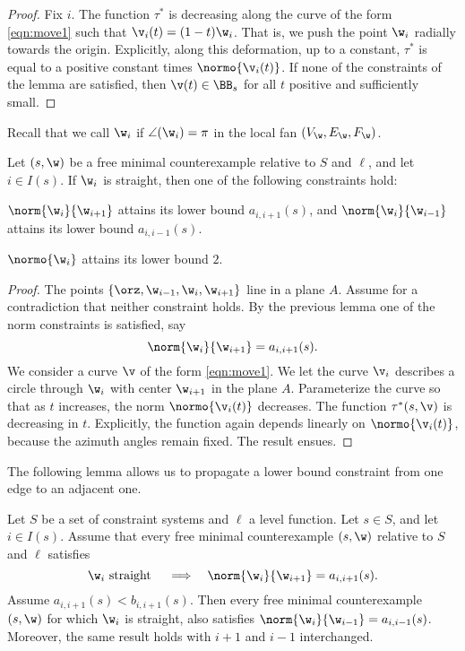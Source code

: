 \begin{proof} Fix $i$.  The function $\tau^*$ is decreasing along
the curve of the form \eqref{eqn:move1} such that
$\v_i(t)=(1-t) \w_i$.
That is, we push the point $\w_i$ radially towards the origin.
Explicitly, along this deformation, up to a constant, $\tau^*$ is equal
to a positive constant times $\normo{\v_i(t)}$.
If none of the constraints of the lemma are satisfied, then
$\v(t)\in \BB_s$ for all $t$ positive and sufficiently
small.
\end{proof}

Recall that we call $\w_i$ 
if $\angle(\w_i)=\pi$ in the local fan $(V_\w,E_\w,F_\w)$.

\begin{lemma} 
  Let $(s,\w)$ be a free minimal counterexample relative to $S$ and
  $\ell$,  and let $i\in I(s)$.  If $\w_i$ is straight, then one of the
  following constraints hold:
\item $\norm{\w_i}{\w_{i+1}}$ attains its lower bound $a_{i,i+1}(s)$, and
 $\norm{\w_i}{\w_{i-1}}$ attains its lower bound $a_{i,i-1}(s)$.
\item $\normo{\w_i}$ attains its lower bound $2$.
\end{lemma}

\begin{proof}  The points $\{\orz,\w_{i-1},\w_i,\w_{i+1}\}$ line in a plane $A$.
Assume for a contradiction that neither constraint holds.  By the previous
lemma one of the norm constraints is satisfied, say
\[
\norm{\w_i}{\w_{i+1}}=a_{i,i+1}(s).
\]
We consider a  curve $\v$ of the form \eqref{eqn:move1}.
We let the curve $\v_i$ describes a circle through
 $\w_i$ with center $\w_{i+1}$ in the plane $A$.  Parameterize the curve
so that as $t$ increases, the norm $\normo{\v_i(t)}$ decreases.
The function $\tau^*(s,\v)$ is decreasing in $t$.  Explicitly, the
function again depends linearly on $\normo{\v_i(t)}$, because
the azimuth angles remain fixed.  The result ensues.
\end{proof}

The following lemma allows us to propagate a lower bound constraint
from one edge to an adjacent one.

\begin{lemma} 
  Let $S$ be a set of constraint systems and $\ell$ a level
  function. Let $s\in S$, and let $i\in I(s)$.  Assume that every
  free minimal counterexample $(s,\w)$ relative to $S$ and $\ell$
  satisfies
\[
\w_i \text{ straight } \quad
\Longrightarrow\quad \norm{\w_i}{\w_{i+1}}=a_{i,i+1}(s).
\]
Assume $a_{i,i+1}(s)<b_{i,i+1}(s)$.
Then every free minimal counterexample $(s,\w)$
for which $\w_i$ is straight, also satisfies $\norm{\w_i}{\w_{i-1}}=a_{i,i-1}(s)$.
Moreover, the same result holds with $i+1$ and $i-1$ interchanged.
\end{lemma}


